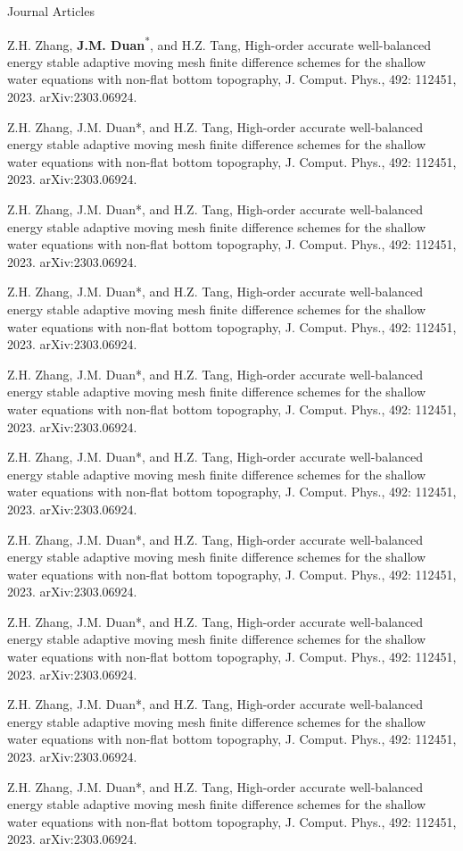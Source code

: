 \begin{cvpublicationsection}{Journal Articles}
\item[\pubenum] Z.H. Zhang, {\bfseries J.M. Duan}\textsuperscript{*}, and H.Z. Tang, High-order accurate well-balanced energy stable adaptive moving mesh finite difference schemes for the shallow water equations with non-flat bottom topography, J. Comput. Phys., 492: 112451, 2023. arXiv:2303.06924.
\item[\pubenum] Z.H. Zhang, J.M. Duan*, and H.Z. Tang, High-order accurate well-balanced energy stable adaptive moving mesh finite difference schemes for the shallow water equations with non-flat bottom topography, J. Comput. Phys., 492: 112451, 2023. arXiv:2303.06924.
\item[\pubenum] Z.H. Zhang, J.M. Duan*, and H.Z. Tang, High-order accurate well-balanced energy stable adaptive moving mesh finite difference schemes for the shallow water equations with non-flat bottom topography, J. Comput. Phys., 492: 112451, 2023. arXiv:2303.06924.
\item[\pubenum] Z.H. Zhang, J.M. Duan*, and H.Z. Tang, High-order accurate well-balanced energy stable adaptive moving mesh finite difference schemes for the shallow water equations with non-flat bottom topography, J. Comput. Phys., 492: 112451, 2023. arXiv:2303.06924.
\item[\pubenum] Z.H. Zhang, J.M. Duan*, and H.Z. Tang, High-order accurate well-balanced energy stable adaptive moving mesh finite difference schemes for the shallow water equations with non-flat bottom topography, J. Comput. Phys., 492: 112451, 2023. arXiv:2303.06924.
\item[\pubenum] Z.H. Zhang, J.M. Duan*, and H.Z. Tang, High-order accurate well-balanced energy stable adaptive moving mesh finite difference schemes for the shallow water equations with non-flat bottom topography, J. Comput. Phys., 492: 112451, 2023. arXiv:2303.06924.
\item[\pubenum] Z.H. Zhang, J.M. Duan*, and H.Z. Tang, High-order accurate well-balanced energy stable adaptive moving mesh finite difference schemes for the shallow water equations with non-flat bottom topography, J. Comput. Phys., 492: 112451, 2023. arXiv:2303.06924.
\item[\pubenum] Z.H. Zhang, J.M. Duan*, and H.Z. Tang, High-order accurate well-balanced energy stable adaptive moving mesh finite difference schemes for the shallow water equations with non-flat bottom topography, J. Comput. Phys., 492: 112451, 2023. arXiv:2303.06924.
\item[\pubenum] Z.H. Zhang, J.M. Duan*, and H.Z. Tang, High-order accurate well-balanced energy stable adaptive moving mesh finite difference schemes for the shallow water equations with non-flat bottom topography, J. Comput. Phys., 492: 112451, 2023. arXiv:2303.06924.
\item[\pubenum] Z.H. Zhang, J.M. Duan*, and H.Z. Tang, High-order accurate well-balanced energy stable adaptive moving mesh finite difference schemes for the shallow water equations with non-flat bottom topography, J. Comput. Phys., 492: 112451, 2023. arXiv:2303.06924.
\end{cvpublicationsection}


